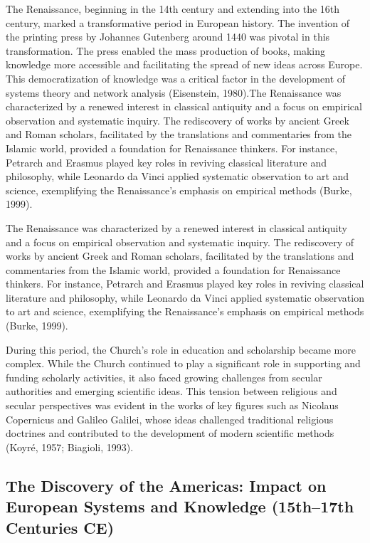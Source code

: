 \documentclass[twocolumn]{article}
\begin{document}
\textcolor{primary}{The Renaissance, beginning in the 14th century and extending into the 16th century, marked a transformative period in European history. The invention of the printing press by Johannes Gutenberg around 1440 was pivotal in this transformation. The press enabled the mass production of books, making knowledge more accessible and facilitating the spread of new ideas across Europe. This democratization of knowledge was a critical factor in the development of systems theory and network analysis (Eisenstein, 1980).}The Renaissance was characterized by a renewed interest in classical antiquity and a focus on empirical observation and systematic inquiry. The rediscovery of works by ancient Greek and Roman scholars, facilitated by the translations and commentaries from the Islamic world, provided a foundation for Renaissance thinkers. For instance, Petrarch and Erasmus played key roles in reviving classical literature and philosophy, while Leonardo da Vinci applied systematic observation to art and science, exemplifying the Renaissance's emphasis on empirical methods (Burke, 1999).

\textcolor{secondary}{The Renaissance was characterized by a renewed interest in classical antiquity and a focus on empirical observation and systematic inquiry. The rediscovery of works by ancient Greek and Roman scholars, facilitated by the translations and commentaries from the Islamic world, provided a foundation for Renaissance thinkers. For instance, Petrarch and Erasmus played key roles in reviving classical literature and philosophy, while Leonardo da Vinci applied systematic observation to art and science, exemplifying the Renaissance's emphasis on empirical methods (Burke, 1999).}

\textcolor{primary}{During this period, the Church’s role in education and scholarship became more complex. While the Church continued to play a significant role in supporting and funding scholarly activities, it also faced growing challenges from secular authorities and emerging scientific ideas. This tension between religious and secular perspectives was evident in the works of key figures such as Nicolaus Copernicus and Galileo Galilei, whose ideas challenged traditional religious doctrines and contributed to the development of modern scientific methods (Koyré, 1957; Biagioli, 1993).}


\subsection{The Discovery of the Americas: Impact on European Systems and Knowledge (15th–17th Centuries CE)}
\end{document}
